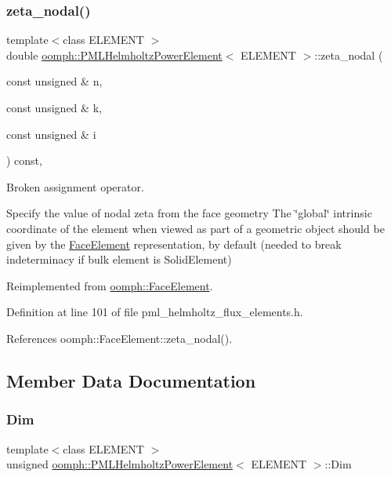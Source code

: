 \subsubsection{\texorpdfstring{zeta\+\_\+nodal()}{zeta\_nodal()}}
{\footnotesize\ttfamily template$<$class E\+L\+E\+M\+E\+NT $>$ \\
double \hyperlink{classoomph_1_1PMLHelmholtzPowerElement}{oomph\+::\+P\+M\+L\+Helmholtz\+Power\+Element}$<$ E\+L\+E\+M\+E\+NT $>$\+::zeta\+\_\+nodal (\begin{DoxyParamCaption}\item[{const unsigned \&}]{n,  }\item[{const unsigned \&}]{k,  }\item[{const unsigned \&}]{i }\end{DoxyParamCaption}) const\hspace{0.3cm}{\ttfamily [inline]}, {\ttfamily [virtual]}}



Broken assignment operator. 

Specify the value of nodal zeta from the face geometry The \char`\"{}global\char`\"{} intrinsic coordinate of the element when viewed as part of a geometric object should be given by the \hyperlink{classoomph_1_1FaceElement}{Face\+Element} representation, by default (needed to break indeterminacy if bulk element is Solid\+Element) 

Reimplemented from \hyperlink{classoomph_1_1FaceElement_a58c9f93705c7741f76c8487d152e68a6}{oomph\+::\+Face\+Element}.



Definition at line 101 of file pml\+\_\+helmholtz\+\_\+flux\+\_\+elements.\+h.



References oomph\+::\+Face\+Element\+::zeta\+\_\+nodal().



\subsection{Member Data Documentation}
\mbox{\label{classoomph_1_1PMLHelmholtzPowerElement_a8372306b2f6fbcbbd1dc74784056a943}} 
\subsubsection{\texorpdfstring{Dim}{Dim}}
{\footnotesize\ttfamily template$<$class E\+L\+E\+M\+E\+NT $>$ \\
unsigned \hyperlink{classoomph_1_1PMLHelmholtzPowerElement}{oomph\+::\+P\+M\+L\+Helmholtz\+Power\+Element}$<$ E\+L\+E\+M\+E\+NT $>$\+::Dim\hspace{0.3cm}{\ttfamily [protected]}}



